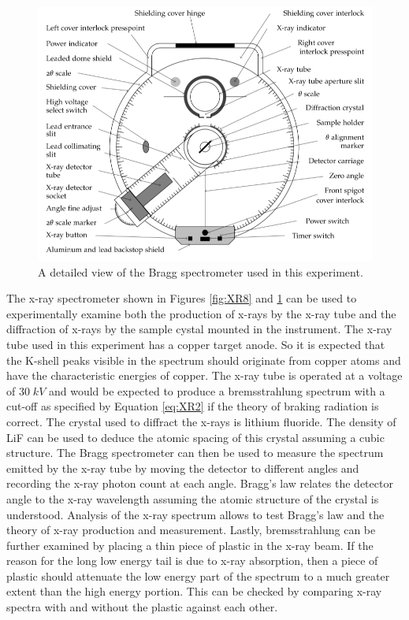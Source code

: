 \begin{figure}[H]
    \centering
    \includegraphics[scale = 0.8]{Images/XR9.PNG}
    \caption{ A detailed view of the Bragg spectrometer used in this experiment.}
    \label{fig:XR9}
\end{figure}

\noindent The x-ray spectrometer shown in Figures \ref{fig:XR8} and \ref{fig:XR9} can be used to experimentally examine both the production of x-rays by the x-ray tube and the diffraction of x-rays by the sample cystal mounted in the instrument. The x-ray tube used in this experiment has a copper target anode. So it is expected that the K-shell peaks visible in the spectrum should originate from copper atoms and have the characteristic energies of copper. The x-ray tube is operated at a voltage of $30 \;kV$ and would be expected to produce a bremsstrahlung spectrum with a cut-off as specified by Equation \ref{eq:XR2} if the theory of braking radiation is correct. The crystal used to diffract the x-rays is lithium fluoride. The density of LiF can be used to deduce the atomic spacing of this crystal assuming a cubic structure. The Bragg spectrometer can then be used to measure the spectrum emitted by the x-ray tube by moving the detector to different angles and recording the x-ray photon count at each angle. Bragg’s law relates the detector angle to the x-ray wavelength assuming the atomic structure of the crystal is understood. Analysis of the x-ray spectrum allows to test Bragg’s law and the theory of x-ray production and measurement. Lastly, bremsstrahlung can be further examined by placing a thin piece of plastic in the x-ray beam. If the reason for the long low energy tail is due to x-ray absorption, then a piece of plastic should attenuate the low energy part of the spectrum to a much greater extent than the high energy portion. This can be checked by comparing x-ray spectra with and without the plastic against each other.



